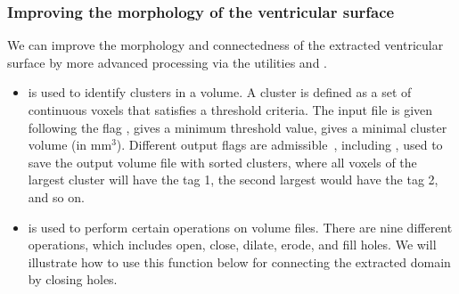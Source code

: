 \subsubsection*{Improving the morphology of the ventricular surface}
We can improve the morphology and connectedness of the extracted
ventricular surface by more advanced processing via the \freesurfer{}
utilities  and .
\begin{itemize}
\item
   is used to identify clusters in a volume. A
  cluster is defined as a set of continuous voxels that satisfies a
  threshold criteria. The input file is given following the flag
  ,  gives a minimum threshold value,
   gives a minimal cluster volume (in
  mm$^3$). Different output flags are
  admissible~\cite{freesurfer-wiki}, including , used to
  save the output volume file with sorted clusters, where all voxels of
  the largest cluster will have the tag 1, the second largest would have
  the tag 2, and so on.
\item
   is used to perform certain operations on
  volume files. There are nine different operations, which includes open,
  close, dilate, erode, and fill holes. We will illustrate how to use
  this function below for connecting the extracted domain by closing
  holes. 
\end{itemize}

